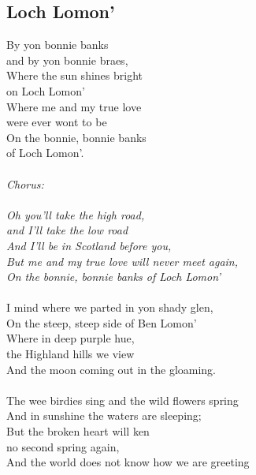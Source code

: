 \documentclass[a5paper]{article}
\begin{document}
\newpage


\subsection{Loch Lomon'} %
\label{sub:loch_lomon}


By yon bonnie banks \\
and by yon bonnie braes,\\
Where the sun shines bright \\
on Loch Lomon'\\
Where me and my true love \\
were ever wont to be\\
On the bonnie, bonnie banks \\
of Loch Lomon'.\\
\\
\textit{Chorus:\\
\\
Oh you'll take the high road,\\
and I'll take the low road\\
And I'll be in Scotland before you,\\
But me and my true love will never meet again,\\
On the bonnie, bonnie banks of Loch Lomon'}\\
\\
I mind where we parted in yon shady glen,\\
On the steep, steep side of Ben Lomon'\\
Where in deep purple hue,\\
the Highland hills we view\\
And the moon coming out in the gloaming.\\
\\
The wee birdies sing and the wild flowers spring\\
And in sunshine the waters are sleeping;\\
But the broken heart will ken \\
no second spring again,\\
And the world does not know how we are greeting\\



\newpage
\end{document}
